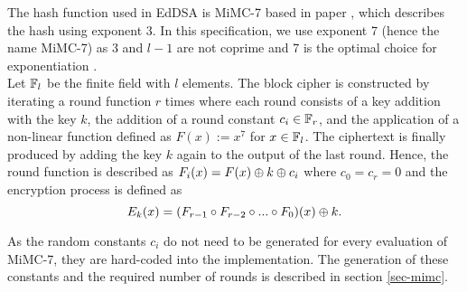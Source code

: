 

The hash function used in EdDSA is MiMC-7 based in paper \cite{mimc}, which describes the hash using exponent 3. In this specification, we use exponent 7 (hence the name MiMC-7) as 3 and $l-1$ are not coprime and 7 is the optimal choice for exponentiation \cite[Sec. 6]{mimc}.\\

%
Let $\mathbb{F}_l$ be the finite field with $l$ elements. The block cipher is constructed by iterating a round function $r$ times where each round consists of a key addition with the key $k$, the addition of a round constant $c_i\in \mathbb{F}_r$, and the application of a non-linear function defined as $F(x) :=x^7$ for $x\in \mathbb{F}_l$. The ciphertext is finally produced by adding the key $k$ again to the output of the last round. Hence, the round function is described as $F_i(x) = F(x) \oplus k \oplus c_i$ where $c_0 = c_r = 0$ and the encryption process is defined as 
	$$ 
		E_k(x) = (F_{r-1} \circ F_{r-2} \circ ... \circ F_0)(x) \oplus k.
	$$







As the random  constants $c_i$ do  not  need  to  be  generated  for  every evaluation of MiMC-7, they are hard-coded into the implementation. The generation of these constants and the required number of rounds is described in section \ref{sec-mimc}. 
%
%
